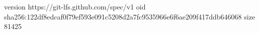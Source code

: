 version https://git-lfs.github.com/spec/v1
oid sha256:122df8edcaf0f79ef593e091c5208d2a7fc9535966e6f6ae209f417ddb646068
size 81425
